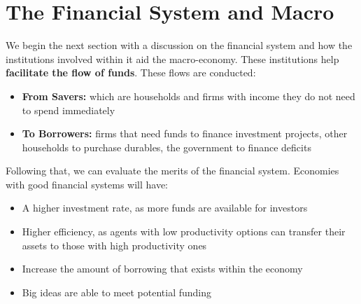 \documentclass[12pt, letterpaper]{article}
\begin{document}
\section{The Financial System and Macro}
We begin the next section with a discussion on the financial system and how the institutions involved within it aid the macro-economy. These institutions help \textbf{facilitate the flow of funds}. These flows are conducted:
\begin{itemize}
	\item \textbf{From Savers:} which are households and firms with income they do not need to spend immediately
	\item \textbf{To Borrowers:} firms that need funds to finance investment projects, other households to purchase durables, the government to finance deficits
\end{itemize}
Following that, we can evaluate the merits of the financial system. Economies with good financial systems will have:
\begin{itemize}
	\item A higher investment rate, as more funds are available for investors
	\item Higher efficiency, as agents with low productivity options can transfer their assets to those with high productivity ones
	\item Increase the amount of borrowing that exists within the economy
	\item Big ideas are able to meet potential funding
\end{itemize}
\end{document}
